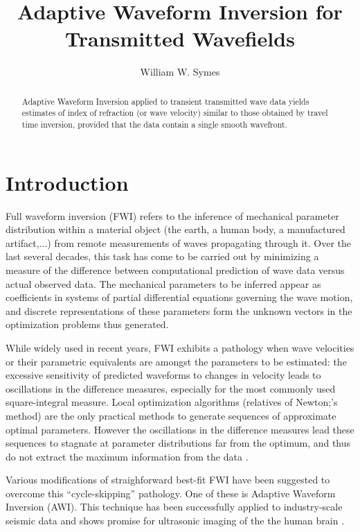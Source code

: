 \title{Adaptive Waveform Inversion for Transmitted Wavefields}
\author{William W. Symes}

\begin{abstract}
Adaptive Waveform Inversion
applied to transient transmitted wave data yields estimates of index of
refraction (or wave velocity) similar to those obtained by travel time
inversion, provided that the data contain a single smooth wavefront.
\end{abstract}

\section{Introduction}
Full waveform inversion (FWI) refers to the inference of mechanical
parameter distribution within a material object  (the earth, a human
body, a manufactured artifact,...) from remote measurements of waves
propagating through it. Over the last several decades, this task has come to
be carried out by minimizing a measure of the difference between computational
prediction of wave data versus actual observed
data. The mechanical parameters to be inferred appear as
coefficients in systems of partial differential equations governing
the wave motion, and discrete representations of these parameters form
the unknown vectors in the optimization problems thus generated.

While widely used in recent years, FWI exhibits a pathology when wave
velocities or their parametric equivalents are amongst the parameters
to be estimated: the excessive sensitivity of predicted waveforms to
changes in velocity leads to oscillations in the difference measures,
especially for the most commonly used square-integral measure. Local
optimization algorithms (relatives of Newton;'s method) are the only practical
methods to generate sequences of approximate optimal
parameters. However the oscillations in the difference measures lead
these sequences to stagnate at parameter distributions
far from the optimum, and thus do not extract the maximum information
from the data \cite[]{VirieuxOperto:09}. 

Various modifications of straighforward best-fit FWI have been
suggested to overcome this ``cycle-skipping'' pathology. One of these
is Adaptive Waveform Inversion \cite[]{Warner:16} (AWI). This
technique has been successfully applied to industry-scale seismic data
\cite[]{GuaschWarnerRavaut:GEO19,Warneretal:SEG21} and shows promise for
ultrasonic imaging of the the human brain
\cite[]{Guaschetal:NPJDM20}.

